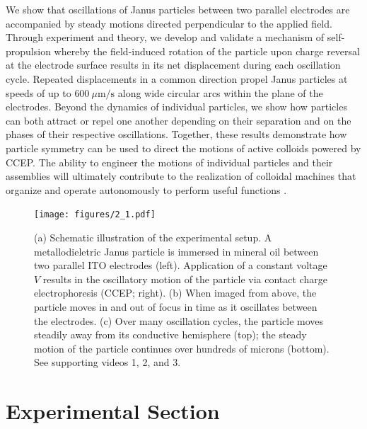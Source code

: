 We show that oscillations of Janus particles between two parallel electrodes are accompanied by steady motions directed perpendicular to the applied field.
Through experiment and theory, we develop and validate a mechanism of self-propulsion whereby the field-induced rotation of the particle upon charge reversal at the electrode surface results in its net displacement during each oscillation cycle.
Repeated displacements in a common direction propel Janus particles at speeds of up to $600~\mu\text{m/s}$ along wide circular arcs within the plane of the electrodes.
Beyond the dynamics of individual particles, we show how particles can both attract or repel one another depending on their separation and on the phases of their respective oscillations.
Together, these results demonstrate how particle symmetry can be used to direct the motions of active colloids powered by CCEP.
The ability to engineer the motions of individual particles and their assemblies will ultimately contribute to the realization of colloidal machines that organize and operate autonomously to perform useful functions \cite{Spellings2015}.

\begin{figure}[p]
\centering
\texttt{[image: figures/2\_1.pdf]}
\caption{ (a) Schematic illustration of the experimental setup. A metallodieletric Janus particle is immersed in mineral oil between two parallel ITO electrodes (left).  Application of a constant voltage $V$ results in the oscillatory motion of the particle via contact charge electrophoresis (CCEP; right). (b) When imaged from above, the particle moves in and out of focus in time as it oscillates between the electrodes. (c) Over many oscillation cycles, the particle moves steadily away from its conductive hemisphere (top); the steady motion of the particle continues over hundreds of microns (bottom).  See supporting videos 1, 2, and 3.}
\label{fig:1}
\end{figure}
 
 
\section{Experimental Section}

